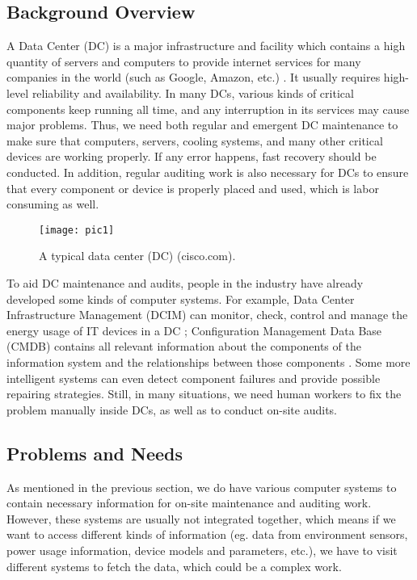 \documentclass[11pt,a4paper]{article}
\begin{document}
\begin{onehalfspace}
\subsection{Background Overview}
\label{sec:backend}
A Data Center (DC) is a major infrastructure and facility which contains a high quantity of servers and computers to provide internet services for many companies in the world (such as Google, Amazon, etc.) \cite{xjl1}. It usually requires high-level reliability and availability. In many DCs, various kinds of critical components keep running all time, and any interruption in its services may cause major problems. Thus, we need both regular and emergent DC maintenance to make sure that computers, servers, cooling systems, and many other critical devices are working properly. If any error happens, fast recovery should be conducted. In addition, regular auditing work is also necessary for DCs to ensure that every component or device is properly placed and used, which is labor consuming as well.

\begin{figure}[H]
	\centering
	\texttt{[image: pic1]}
	\caption{A typical data center (DC) (cisco.com).}
\end{figure}

To aid DC maintenance and audits, people in the industry have already developed some kinds of computer systems. For example, Data Center Infrastructure Management (DCIM) can monitor, check, control and manage the energy usage of IT devices in a DC \cite{xjl1}; Configuration Management Data Base (CMDB) contains all relevant information about the components of the information system and the relationships between those components \cite{xjl2}. Some more intelligent systems can even detect component failures and provide possible repairing strategies. Still, in many situations, we need human workers to fix the problem manually inside DCs, as well as to conduct on-site audits.

\subsection{Problems and Needs}
As mentioned in the previous section, we do have various computer systems to contain necessary information for on-site maintenance and auditing work. However, these systems are usually not integrated together, which means if we want to access different kinds of information (eg. data from environment sensors, power usage information, device models and parameters, etc.), we have to visit different systems to fetch the data, which could be a complex work. 


\end{onehalfspace}
\end{document}
